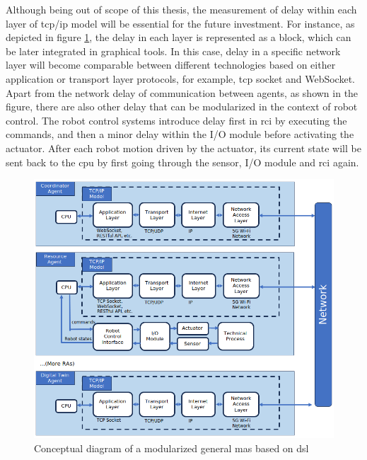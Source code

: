 Although being out of scope of this thesis, the measurement of delay within 
each layer of \gls{tcp/ip} model will be essential for the future investment.
For instance, as depicted in figure \ref{fig: DSLConceptual}, the delay in 
each layer is represented as a block, which can be later integrated in graphical tools.
In this case, delay in a specific network layer will become comparable between
different technologies based on either application or transport layer protocols,
for example, \gls{tcp} socket and WebSocket. Apart from the network delay of
communication between agents, as shown in the figure, there are also other 
delay that can be modularized in the context of robot control. The robot 
control systems introduce delay first in \gls{rci} by executing the commands, 
and then a minor delay within the I/O module before activating the actuator.
After each robot motion driven by the actuator, its current state will be sent 
back to the \gls{cpu} by first going through the sensor, I/O module and \gls{rci} 
again. 







\begin{figure}[htb]
    \includegraphics[width=\textwidth]{figures/DSLConceptual.png}
    
    \centering
    \caption{Conceptual diagram of a modularized general \gls{mas} based on \gls{dsl} \label{fig: DSLConceptual}}
\end{figure}
